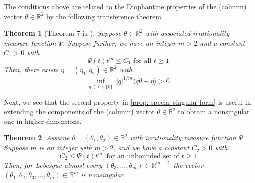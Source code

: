 \documentclass[reqno,11pt, twoside]{amsart}
\theoremstyle{plain}
\newtheorem{thm}{Theorem}[section]
\theoremstyle{definition}
\theoremstyle{definition}
\theoremstyle{remark}
\numberwithin{equation}{section}
\newcommand{\R}{{\mathbb{R}}}
\newcommand{\Z}{{\mathbb{Z}}}
\begin{document}
The conditions above are related to the Diophantine properties of the (column) vector $\theta \in \R^2$ by the following transference theorem.
\begin{thm}[Theorem 7 in \cite{Jarniktransference}]\label{thm: Jarnik transference}
    Suppose $\theta \in \R^2$ with associated irrationality measure function $\Psi$. Suppose further, we have an integer $m >2$ and a constant $C_1 > 0$ with
    \begin{equation*}
        \Psi(t) t^m \leq C_1 \text{ for all } t \geq 1.
    \end{equation*}
    Then, there exists $\eta = (\eta_1, \eta_2) \in \R^2$ with 
    \begin{equation*}
        \inf_{q \in \Z \smallsetminus \{0\}}\ |q|^{1/m} \langle q\theta - \eta\rangle > 0.
    \end{equation*}
\end{thm}
Next, we see that the second property in \ref{prop: special singular form} is useful in extending the components of the (column) vector $\theta \in \R^2$ to obtain a nonsingular one in higher dimensions. 
\begin{thm}\label{thm: augment to get nonsingular}
    Assume $\theta = (\theta_1, \theta_2) \in \R^2$ with irrationality measure function $\Psi$. Suppose $m$ is an integer with $m > 2$, and we have a constant $C_2 >0$ with
    \begin{equation}\label{eq: lower bound Psi}
        C_2 \leq \Psi(t) t^m \ \text{ for an unbounded set of } t \geq 1.
    \end{equation}
    Then, for Lebesgue almost every $(\theta_3,\dots, \theta_m) \in \R^{m-2}$, the vector $(\theta_1, \theta_2, \theta_3,\dots,\theta_m) \in \R^m$ is nonsingular. 
\end{thm}
\end{document}
